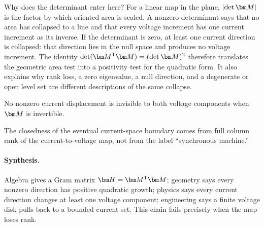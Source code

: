 Why does the determinant enter here?  For a linear map in the plane,
$\abs{\det\Apsm}$ is the factor by which oriented area is scaled.  A nonzero
determinant says that no area has collapsed to a line and that every voltage
increment has one current increment as its inverse.  If the determinant is
zero, at least one current direction is collapsed: that direction lies in the
null space and produces no voltage increment.  The identity
$\det(\Apsm\trans\Apsm)=(\det\Apsm)^2$ therefore translates the geometric
area test into a positivity test for the quadratic form.  It also explains
why rank loss, a zero eigenvalue, a null direction, and a degenerate or open
level set are different descriptions of the same collapse.

\physinterpretation No nonzero current displacement is invisible to both
voltage components when $\Apsm$ is invertible.

\engineeringconsequence The closedness of the eventual current-space boundary
comes from full column rank of the current-to-voltage map, not from the label
``synchronous machine.''

\paragraph{Synthesis.}
Algebra gives a Gram matrix $\Hpsm=\Apsm\trans\Apsm$; geometry says every
nonzero direction has positive quadratic growth; physics says every current
direction changes at least one voltage component; engineering says a finite
voltage disk pulls back to a bounded current set.  This chain fails precisely
when the map loses rank.
